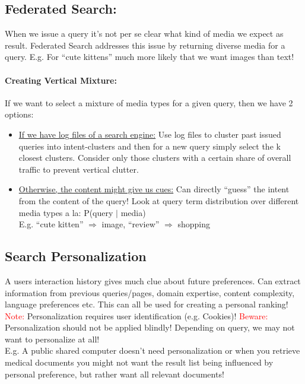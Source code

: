 \documentclass[a4paper,11pt]{article}
\begin{document}
\begin{multicols}{2}
\subsection{Federated Search:}
When we issue a query it's not per se clear what kind of media we expect as result. Federated Search addresses this issue by returning diverse media for a query. E.g. For ``cute kittens'' much more likely that we want images than text!

\paragraph{Creating Vertical Mixture:} If we want to select a mixture of media types for a given query, then we have 2 options:
\begin{itemize}
  \item \underline{If we have log files of a search engine:} Use log files to cluster past issued queries into intent-clusters and then for a new query simply select the k closest clusters. Consider only those clusters with a certain share of overall traffic to prevent vertical clutter.

  \item \underline{Otherwise, the content might give us cues:} Can directly ``guess'' the intent from the content of the query! Look at query term distribution over different media types a la: P(query $|$ media)\\
  E.g. ``cute kitten'' $\Rightarrow$ image, ``review'' $\Rightarrow$ shopping
\end{itemize}

\subsection{Search Personalization}
A users interaction history gives much clue about future preferences. Can extract information from previous queries/pages, domain expertise, content complexity, language preferences etc. This can all be used for creating a personal ranking!\\
\textcolor{red}{Note:} Personalization requires user identification (e.g. Cookies)!
\textcolor{red}{Beware:} Personalization should not be applied blindly! Depending on query, we may not want to personalize at all!\\
E.g. A public shared computer doesn't need personalization or when you retrieve medical documents you might not want the result list being influenced by personal preference, but rather want all relevant documents!


\end{multicols}
\end{document}
